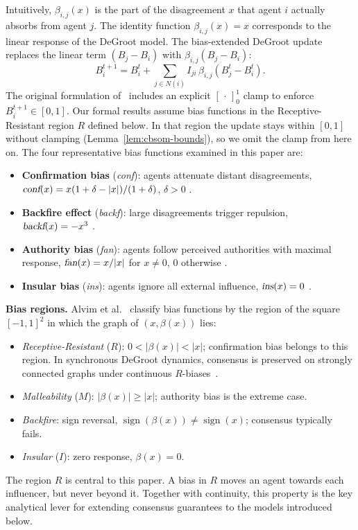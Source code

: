 Intuitively, $\beta_{i,j}(x)$ is the part of the disagreement $x$ that
agent $i$ actually absorbs from agent $j$. The identity function
$\beta_{i,j}(x)=x$ corresponds to the linear response of the DeGroot model.
The bias-extended DeGroot update replaces the linear term
$(B_j-B_i)$ with $\beta_{i,j}(B_j-B_i)$:
\begin{equation}\label{eq:degroot-bias}
  B_i^{t+1}
  = B_i^t + \sum_{j\in N(i)} I_{ji}\,
    \beta_{i,j}(B_j^t-B_i^t).
\end{equation}
The original formulation of~\cite{Alvim2024} includes an explicit
$[\,\cdot\,]_0^1$ clamp to enforce $B_i^{t+1}\in[0,1]$. Our formal results
assume bias functions in the Receptive-Resistant region $R$ defined below.
In that region the update stays within $[0,1]$ without clamping
(Lemma~\ref{lem:cbsom-bounds}), so we omit the clamp from here on.
The four representative bias functions examined in this paper are:
\begin{itemize}
  \item \textbf{Confirmation bias} (\textsl{conf}): agents attenuate
    distant disagreements,
    $\textsl{conf}(x)=x(1+\delta-|x|)/(1+\delta)$, $\delta>0$
    \cite{Alvim2024,Nyhan2010}.
  \item \textbf{Backfire effect} (\textsl{backf}): large disagreements
    trigger repulsion, $\textsl{backf}(x)=-x^3$
    \cite{Alvim2024,Friedrich2020}.
  \item \textbf{Authority bias} (\textsl{fan}): agents follow
    perceived authorities with maximal response,
    $\textsl{fan}(x)=x/|x|$ for $x\ne 0$, $0$ otherwise
    \cite{Alvim2024,Aronson2010}.
  \item \textbf{Insular bias} (\textsl{ins}): agents ignore all
    external influence, $\textsl{ins}(x)=0$ \cite{Alvim2024}.
\end{itemize}

\noindent\textbf{Bias regions.}
Alvim et al.~\cite{Alvim2024} classify bias functions by the
region of the square $[-1,1]^2$ in which the graph of $(x,\beta(x))$ lies:
\begin{itemize}
  \item \emph{Receptive-Resistant} ($R$): $0<|\beta(x)|<|x|$;
    confirmation bias belongs to this region. In synchronous DeGroot
    dynamics, consensus is preserved on strongly connected graphs
    under continuous $R$-biases~\cite{Alvim2024}.
  \item \emph{Malleability} ($M$): $|\beta(x)|\ge|x|$; authority
    bias is the extreme case.
  \item \emph{Backfire}: sign reversal,
    $\operatorname{sign}(\beta(x))\ne\operatorname{sign}(x)$;
    consensus typically fails.
  \item \emph{Insular} ($I$): zero response, $\beta(x)=0$.
\end{itemize}
The region $R$ is central to this paper. A bias in $R$ moves an agent
towards each influencer, but never beyond it. Together with continuity,
this property is the key analytical lever for extending consensus
guarantees to the models introduced below.

